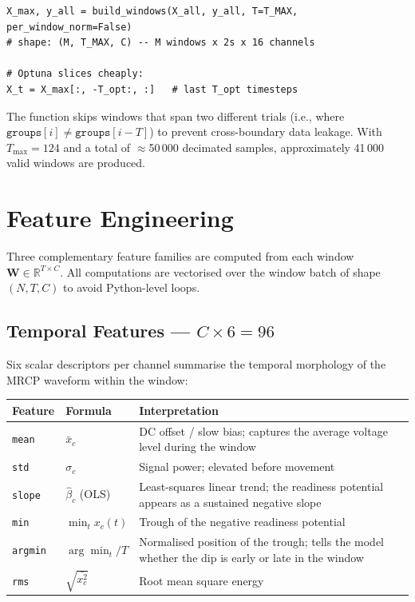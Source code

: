 \documentclass[12pt,a4paper]{article}
\begin{document}
\begin{lstlisting}[style=pycode]
X_max, y_all = build_windows(X_all, y_all, T=T_MAX, per_window_norm=False)
# shape: (M, T_MAX, C) -- M windows x 2s x 16 channels

# Optuna slices cheaply:
X_t = X_max[:, -T_opt:, :]   # last T_opt timesteps
\end{lstlisting}

The function skips windows that span two different trials (i.e., where
$\texttt{groups}[i] \neq \texttt{groups}[i-T]$) to prevent cross-boundary
data leakage. With $T_{\max} = 124$ and a total of $\approx$50\,000
decimated samples, approximately 41\,000 valid windows are produced.

\section{Feature Engineering}

Three complementary feature families are computed from each window
$\mathbf{W} \in \mathbb{R}^{T \times C}$. All computations are vectorised
over the window batch of shape $(N, T, C)$ to avoid Python-level loops.

\subsection{Temporal Features — $C \times 6 = 96$}

Six scalar descriptors per channel summarise the temporal morphology of the
MRCP waveform within the window:

\begin{center}
\begin{tabular}{llp{7.5cm}}
\toprule
Feature & Formula & Interpretation \\
\midrule
\texttt{mean} & $\bar{x}_c$ & DC offset / slow bias; captures the average voltage level during the window \\
\texttt{std} & $\sigma_c$ & Signal power; elevated before movement \\
\texttt{slope} & $\hat{\beta}_c$ (OLS) & Least-squares linear trend; the readiness potential appears as a sustained negative slope \\
\texttt{min} & $\min_t x_c(t)$ & Trough of the negative readiness potential \\
\texttt{argmin} & $\arg\min_t / T$ & Normalised position of the trough; tells the model whether the dip is early or late in the window \\
\texttt{rms} & $\sqrt{\bar{x_c^2}}$ & Root mean square energy \\
\bottomrule
\end{tabular}
\end{center}
\end{document}
